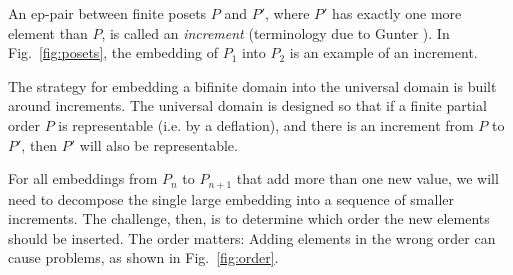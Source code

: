 \documentclass{llncs}
\begin{document}
An ep-pair between finite posets $P$ and $P'$, where $P'$ has exactly
one more element than $P$, is called an \emph{increment} (terminology
due to Gunter \cite{gunter92semantics}).  In Fig.~\ref{fig:posets},
the embedding of $P_1$ into $P_2$ is an example of an increment.

The strategy for embedding a bifinite domain into the universal domain
is built around increments.  The universal domain is designed so that
if a finite partial order $P$ is representable (i.e. by a deflation),
and there is an increment from $P$ to $P'$, then $P'$ will also be
representable.

For all embeddings from $P_n$ to $P_{n+1}$ that add more than one new
value, we will need to decompose the single large embedding into a
sequence of smaller increments.  The challenge, then, is to determine
which order the new elements should be inserted.  The order matters:
Adding elements in the wrong order can cause problems, as shown in
Fig.~\ref{fig:order}.
\end{document}
